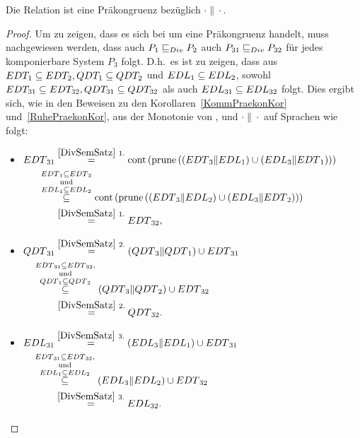 \begin{Kor}
  Die Relation \DRel{} ist eine Präkongruenz bezüglich $\cdot\|\cdot$.
\end{Kor}

\begin{proof}
  Um zu zeigen, dass es sich bei \DRel{} um eine Präkongruenz handelt, muss
  nachgewiesen werden, dass auch $P_1 \sqsubseteq  _{Div} P_2$ auch $P_{31} \sqsubseteq  _{Div} P_{32}$ für
  jedes komponierbare System $P_3$ folgt. D.h.\ es ist zu zeigen, dass aus
  $EDT _1\subseteq EDT _2, QDT _1\subseteq QDT _2$ und $EDL _1\subseteq EDL
  _2$, sowohl $EDT _{31} \subseteq EDT _{32}, QDT _{31} \subseteq QDT
  _{32}$ als auch $EDL _{31}\subseteq EDL _{32}$ folgt. Dies ergibt sich, wie
  in den Beweisen zu den Korollaren~\ref{KommPraekonKor}
  und~\ref{RuhePraekonKor}, aus der Monotonie von \cont{}, \prune{} und
  $\cdot\|\cdot$ auf Sprachen wie folgt:
  \begin{itemize}
    \item $\begin{aligned}[t]
        \EDT{}_{31} &\overset{\ref{DivSemSatz}~1.}{=}
        \cont{}\left(\prune{}\left(\left(\EDT{}_3\|\EDL{}_1\right) \cup
        \left(\EDL{}_3\|\EDT{}_1\right)\right)\right)\\
        &\hspace{-0.6cm}\overset{\EDT{}_1\subseteq
      \EDT{}_2}{\overset{\mathrm{und}}{\overset{\EDL{}_1\subseteq
    \EDL{}_2}{\subseteq}}}
    \cont{}\left(\prune{}\left(\left(\EDT{}_3\|\EDL{}_2\right) \cup
        \left(\EDL{}_3\|\EDT{}_2\right)\right)\right)\\
      &\overset{\ref{DivSemSatz}~1.}{=} \EDT{}_{32},
    \end{aligned}$
    \item $\begin{aligned}[t]
        \QDT{}_{31} &\overset{\ref{DivSemSatz}~2.}{=} (\QDT{}_3\|\QDT{}_1)
        \cup \EDT{}_{31}\\
        &\hspace{-0.8cm}\overset{\EDT{}_{31}\subseteq
      \EDT{}_{32},}{\overset{\mathrm{und}}{\overset{\QDT{}_1\subseteq
      \QDT{}_2}{\subseteq}}} (\QDT{}_3\|\QDT{}_2) \cup \EDT{}_{32}\\
      &\overset{\ref{DivSemSatz}~2.}{=} \QDT{}_{32}.
    \end{aligned}$
    \item $\begin{aligned}[t]
        \EDL{}_{31} &\overset{\ref{DivSemSatz}~3.}{=} (\EDL{}_3\|\EDL{}_1)
        \cup \EDT{}_{31}\\
        &\hspace{-0.8cm}\overset{\EDT{}_{31}\subseteq
      \EDT{}_{32},}{\overset{\mathrm{und}}{\overset{\EDL{}_1\subseteq
      \EDL{}_2}{\subseteq}}} (\EDL{}_3\|\EDL{}_2) \cup \EDT{}_{32}\\
      &\overset{\ref{DivSemSatz}~3.}{=} \EDL{}_{32}.
    \end{aligned}$
  \end{itemize}
\end{proof}


